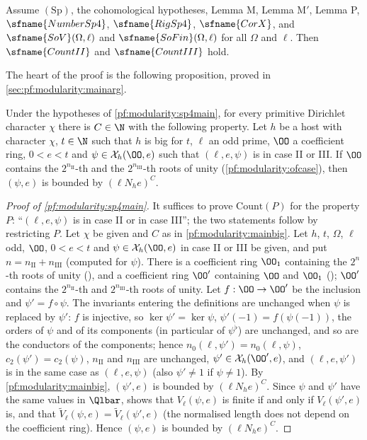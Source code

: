 \begin{theorem}\label{pf:modularity:sp4main}
Assume $(\mathrm{Sp})$, the cohomological hypotheses, Lemma M, Lemma M$'$, Lemma P, $\sfname{NumberSp4}$,
$\sfname{RigSp4}$, $\sfname{CorX}$, and $\sfname{SoV}(\Omega,\ell)$ and $\sfname{SoFin}(\Omega,\ell)$ for all $\Omega$ and
$\ell$. Then $\sfname{CountII}$ and $\sfname{CountIII}$ hold.
\end{theorem}

The heart of the proof is the following proposition, proved in \cref{sec:pf:modularity:mainarg}.

\begin{proposition}\label{pf:modularity:mainbig}
Under the hypotheses of \cref{pf:modularity:sp4main}, for every primitive Dirichlet character $\chi$ there is $C\in\N$
with the following property. Let $h$ be a host with character $\chi$, $t\in\N$ such that $h$ is big for $t$, $\ell$ an
odd prime, $\OO$ a coefficient ring, $0<e<t$ and $\psi\in\mathcal X_h(\OO,e)$ such that $(\ell,e,\psi)$ is in case II
or III. If $\OO$ contains the $2^{n_{\mathrm{II}}}$-th and the $2^{n_{\mathrm{III}}}$-th roots of unity
(\cref{pf:modularity:ofcase}), then $(\psi,e)$ is bounded by $(\ell N_he)^C$.
\end{proposition}

\begin{proof}[Proof of \cref{pf:modularity:sp4main}]
It suffices to prove $\mathrm{Count}(P)$ for the property $P$: ``$(\ell,e,\psi)$ is in case II or in case III''; the
two statements follow by restricting $P$. Let $\chi$ be given and $C$ as in \cref{pf:modularity:mainbig}. Let $h$, $t$,
$\Omega$, $\ell$ odd, $\OO$, $0<e<t$ and $\psi\in\mathcal X_h(\OO,e)$ in case II or III be given, and put
$n=n_{\mathrm{II}}+n_{\mathrm{III}}$ (computed for $\psi$). There is a coefficient ring $\OO_1$ containing the $2^n$-th roots of unity
(), and a coefficient ring $\OO'$ containing $\OO$ and $\OO_1$
(); $\OO'$ contains the $2^{n_{\mathrm{II}}}$-th and $2^{n_{\mathrm{III}}}$-th roots
of unity. Let $f:\OO\to\OO'$ be the inclusion and $\psi'=f\circ\psi$. The invariants entering the definitions are
unchanged when $\psi$ is replaced by $\psi'$: $f$ is injective, so $\ker\psi'=\ker\psi$, $\psi'(-1)=f(\psi(-1))$, the
orders of $\psi$ and of its components (in particular of $\psi^\flat$) are unchanged, and so are the conductors of the
components; hence $n_0(\ell,\psi')=n_0(\ell,\psi)$, $c_2(\psi')=c_2(\psi)$, $n_{\mathrm{II}}$ and $n_{\mathrm{III}}$
are unchanged, $\psi'\in\mathcal X_h(\OO',e)$, and $(\ell,e,\psi')$ is in the same case as $(\ell,e,\psi)$ (also
$\psi'\ne1$ if $\psi\ne1$). By \cref{pf:modularity:mainbig}, $(\psi',e)$ is bounded by $(\ell N_he)^C$. Since $\psi$
and $\psi'$ have the same values in $\Qlbar$,  shows that $V_\ell(\psi,e)$ is
finite if and only if $V_\ell(\psi',e)$ is, and that $\widetilde V_\ell(\psi,e)=\widetilde V_\ell(\psi',e)$ (the normalised
length does not depend on the coefficient ring). Hence $(\psi,e)$ is bounded by $(\ell N_he)^C$.
\end{proof}

